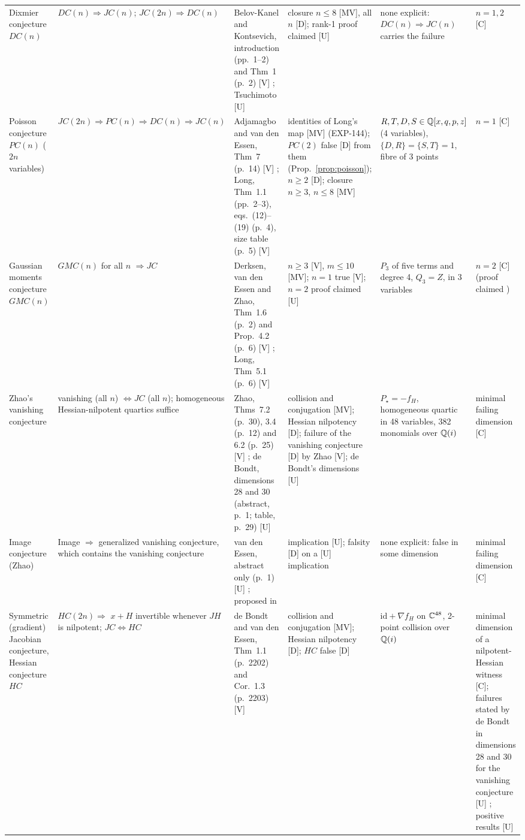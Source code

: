 \begin{landscape}
\begin{longtable}{@{}L{0.11\textheight}L{0.17\textheight}L{0.19\textheight}L{0.14\textheight}L{0.19\textheight}L{0.12\textheight}@{}}
Dixmier conjecture $DC(n)$ & $DC(n)\Rightarrow JC(n)$; $JC(2n)\Rightarrow DC(n)$ & Belov-Kanel and Kontsevich, introduction (pp.~1--2) and Thm~1 (p.~2) [V] \cite{BKK2007}; Tsuchimoto [U] \cite{Tsuchimoto2005} & closure $n\le8$ [MV], all $n$ [D]; rank-1 proof claimed [U] & none explicit: $DC(n)\Rightarrow JC(n)$ carries the failure & $n=1,2$ [C] \\[3pt]
Poisson conjecture $PC(n)$ ($2n$ variables) & $JC(2n)\Rightarrow PC(n)\Rightarrow DC(n)\Rightarrow JC(n)$ & Adjamagbo and van den Essen, Thm~7 (p.~14) [V] \cite{AvdE2007}; Long, Thm~1.1 (pp.~2--3), eqs.~(12)--(19) (p.~4), size table (p.~5) [V] \cite{LongPoisson2026} & identities of Long's map [MV] (EXP-144); $PC(2)$ false [D] from them (Prop.~\ref{prop:poisson}); $n\ge2$ [D]; closure $n\ge3$, $n\le8$ [MV] & $R,T,D,S\in\mathbb{Q}[x,q,p,z]$ (4 variables), $\{D,R\}=\{S,T\}=1$, fibre of 3 points & $n=1$ [C] \\[3pt]
Gaussian moments conjecture $GMC(n)$ & $GMC(n)$ for all $n$ $\Rightarrow JC$ & Derksen, van den Essen and Zhao, Thm~1.6 (p.~2) and Prop.~4.2 (p.~6) [V] \cite{DEZ2017}; Long, Thm~5.1 (p.~6) [V] \cite{Long2026} & $n\ge3$ [V], $m\le10$ [MV]; $n=1$ true [V]; $n=2$ proof claimed [U] & $P_3$ of five terms and degree 4, $Q_3=Z$, in 3 variables & $n=2$ [C] (proof claimed \cite[abstract, p.~1]{Wilson2026}) \\[3pt]
Zhao's vanishing conjecture & vanishing (all $n$) $\Leftrightarrow JC$ (all $n$); homogeneous Hessian-nilpotent quartics suffice & Zhao, Thms~7.2 (p.~30), 3.4 (p.~12) and 6.2 (p.~25) [V] \cite{Zhao2004}; de Bondt, dimensions 28 and 30 (abstract, p.~1; table, p.~29) [U] \cite{deBondt2026} & collision and conjugation [MV]; Hessian nilpotency [D]; failure of the vanishing conjecture [D] by Zhao [V]; de Bondt's dimensions [U] & $P_\star=-f_H$, homogeneous quartic in 48 variables, 382 monomials over $\mathbb{Q}(i)$ & minimal failing dimension [C] \\[3pt]
Image conjecture (Zhao) & Image $\Rightarrow$ generalized vanishing conjecture, which contains the vanishing conjecture & van den Essen, abstract only (p.~1) [U] \cite{vdE2010}; proposed in \cite{Zhao2010} & implication [U]; falsity [D] on a [U] implication & none explicit: false in some dimension & minimal failing dimension [C] \\[3pt]
Symmetric (gradient) Jacobian conjecture, Hessian conjecture $HC$ & $HC(2n)\Rightarrow$ $x+H$ invertible whenever $JH$ is nilpotent; $JC\Leftrightarrow HC$ & de Bondt and van den Essen, Thm~1.1 (p.~2202) and Cor.~1.3 (p.~2203) [V] \cite{dBvdE2005} & collision and conjugation [MV]; Hessian nilpotency [D]; $HC$ false [D] & $\mathrm{id}+\nabla f_H$ on $\mathbb{C}^{48}$, 2-point collision over $\mathbb{Q}(i)$ & minimal dimension of a nilpotent-Hessian witness [C]; failures stated by de Bondt in dimensions 28 and 30 for the vanishing conjecture [U] \cite{deBondt2026}; positive results \cite{dBvdE2005b, vdEW2004} [U] \\[3pt]
\end{longtable}
\end{landscape}
\clearpage
